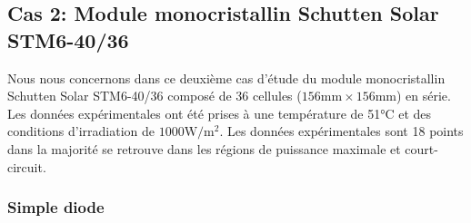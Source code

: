 
\subsection{Cas 2: Module monocristallin Schutten Solar STM6-40/36}

Nous nous concernons dans ce deuxième cas d'étude du module monocristallin Schutten Solar STM6-40/36 composé de 36 cellules ($156\si{\milli\meter}\times 156\si{\milli\meter}$) en série. Les données expérimentales ont été prises à une température de 51\si{\celsius} et des conditions d'irradiation de $1000 \si{\watt\per\square\meter}$. Les données expérimentales sont 18 points dans la majorité se retrouve dans les régions de puissance maximale et court-circuit.

\subsubsection{Simple diode}

